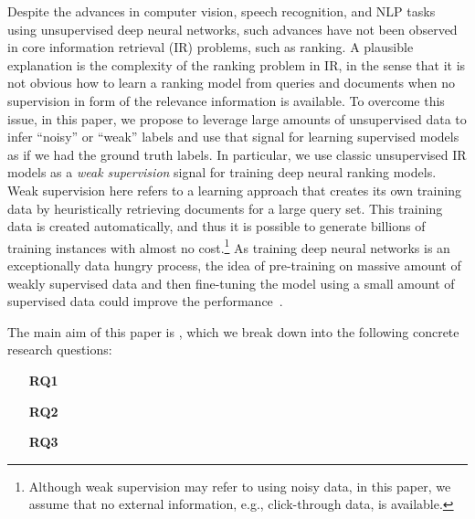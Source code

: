 \documentclass[sigconf]{acmart}
\newcommand{\sshrink}{\vspace{-.80ex}}
\begin{document}
Despite the advances in computer vision, speech recognition, and NLP tasks using unsupervised deep neural networks, such advances have not been observed in core information retrieval (IR) problems, such as ranking. 
A plausible explanation is the complexity of the ranking problem in IR, in the sense that it is not obvious how to learn a ranking model from queries and documents when no supervision in form of the relevance information is available.
To overcome this issue, in this paper, we propose to leverage large amounts of unsupervised data to infer ``noisy'' or ``weak'' labels and use that signal for learning supervised models as if we had the ground truth labels. 
In particular, we use classic unsupervised IR models as a \emph{weak supervision} signal for training deep neural ranking models.
Weak supervision here refers to a learning approach that creates its own training data by heuristically retrieving documents for a large query set. 
This training data is created automatically, and thus it is possible to generate billions of training instances with almost no cost.\footnote{Although weak supervision may refer to using noisy data, in this paper, we assume that no external information, e.g., click-through data, is available.}
%
As training deep neural networks is an exceptionally data hungry process, the idea of pre-training on massive amount of weakly supervised data and then fine-tuning the model using a small amount of supervised data could improve the performance~\citep{Rrhan:2010}. 


The main aim of this paper is \textsl{\maingoal}, which we break down into the following concrete research questions:
\begin{enumerate}
  \setlength{\topsep}{0pt}
  \setlength{\partopsep}{0pt}
  \setlength{\itemsep}{0pt}
  \setlength{\parskip}{0pt}
  \setlength{\parsep}{0pt}
\item[\textbf{RQ1}] \textsl{\rqone}
\item[\textbf{RQ2}] \textsl{\rqtwo}
\item[\textbf{RQ3}] \textsl{\rqthree}
\end{enumerate}
\end{document}
